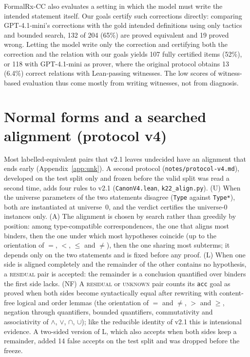 \documentclass[10pt]{article}
\theoremstyle{definition}
\newcommand{\V}[1]{\textsc{#1}}
\begin{document}
FormalRx-CC also evaluates a setting in which the model must write the intended statement
itself. Our goals certify such corrections directly: comparing GPT-4.1-mini's corrections with
the gold intended definitions using only tactics and bounded search, 132 of 204 (65\%) are proved
equivalent and 19 proved wrong. Letting the model write only the correction and certifying both
the correction and the relation with our goals yields 107 fully certified items (52\%), or 118
with GPT-4.1-mini as prover, where the original protocol obtains 13 (6.4\%) correct relations
with Lean-passing witnesses. The low scores of witness-based evaluation thus come mostly from
writing witnesses, not from diagnosis.

\section{Normal forms and a searched alignment (protocol v4)}\label{app:v4}

\VfRulesTable

Most labelled-equivalent pairs that v2.1 leaves undecided have an alignment that ends early
(Appendix~\ref{app:unk}). A second protocol (\texttt{notes/protocol-v4.md}), developed on the test
split only and frozen before the valid split was read a second time, adds four rules to v2.1
(\texttt{CanonV4.lean}, \texttt{k22\_align.py}). (U) When the universe parameters of the two
statements disagree (\texttt{Type} against \texttt{Type*}), both are instantiated at universe~0, and
the verdict certifies the universe-0 instances only. (A) The alignment is chosen by search rather
than greedily by position: among type-compatible correspondences, the one that aligns most
binders, then the one under which most hypotheses coincide (up to the orientation of $=$, $<$,
$\le$ and $\ne$), then the one sharing most subterms; it depends only on the two statements and
is fixed before any proof. (L) When one side is aligned completely and the remainder of the other
contains no hypothesis, a \V{residual} pair is accepted: the remainder is a conclusion quantified
over binders the first side lacks. (NF) A \V{residual} or \V{unknown} pair counts its
\texttt{acc} goal as proved when both sides become syntactically equal after rewriting with
content-free logical and order lemmas (the orientation of $=$ and $\ne$, $>$ and $\ge$, negation
through quantifiers, bounded quantifiers, commutativity and associativity of $\wedge$, $\vee$,
$\cap$, $\cup$); like the reducible identity of v2.1 this is intensional evidence. A two-sided
version of L, which also accepts when both sides keep a remainder, added 14 false accepts on the
test split and was dropped before the freeze.
\end{document}
